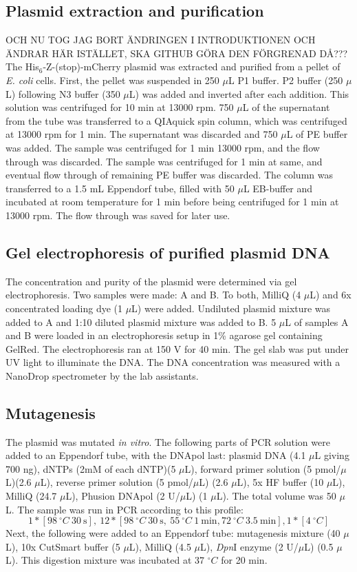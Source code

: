 \documentclass[11pt,a4paper]{article}
\begin{document}
\subsection{Plasmid extraction and purification}
OCH NU TOG JAG BORT ÄNDRINGEN I INTRODUKTIONEN OCH ÄNDRAR HÄR ISTÄLLET, SKA GITHUB GÖRA DEN FÖRGRENAD DÅ??? The His$_6$-Z-(stop)-mCherry plasmid was extracted and purified from a pellet of \textit{E. coli} cells. First, the pellet was suspended in 250 $\mu$L P1 buffer. P2 buffer (250 $\mu$L) following N3 buffer (350 $\mu$L) was added and inverted after each addition. This solution was centrifuged for 10 min at 13000 rpm. 750 $\mu$L of the supernatant from the tube was transferred to a QIAquick spin column, which was centrifuged at 13000 rpm for 1 min. The supernatant was discarded and 750 $\mu$L of PE buffer was added. The sample was centrifuged for 1 min 13000 rpm, and the flow through was discarded. The sample was centrifuged for 1 min at same, and eventual flow through of remaining PE buffer was discarded. The column was transferred to a 1.5 mL Eppendorf tube, filled with 50 $\mu$L EB-buffer and incubated at room temperature for 1 min before being centrifuged for 1 min at 13000 rpm. The flow through was saved for later use.

\subsection{Gel electrophoresis of purified plasmid DNA}

The concentration and purity of the plasmid were determined via gel electrophoresis. Two samples were made: A and B. To both, MilliQ (4 $\mu$L) and 6x concentrated loading dye (1 $\mu$L) were added. Undiluted plasmid mixture was added to A and 1:10 diluted plasmid mixture was added to B. 5 $\mu$L of samples A and B were loaded in an electrophoresis setup in 1\% agarose gel containing GelRed. The electrophoresis ran at 150 V for 40 min. The gel slab was put under UV light to illuminate the DNA. The DNA concentration was measured with a NanoDrop spectrometer by the lab assistants.

\subsection{Mutagenesis}
The plasmid was mutated \textit{in vitro}. The following parts of PCR solution were added to an Eppendorf tube, with the DNApol last: plasmid DNA (4.1 $\mu$L giving 700 ng), dNTPs (2mM of each dNTP)(5 $\mu$L), forward primer solution (5 pmol/$\mu$L)(2.6 $\mu$L), reverse primer solution (5 pmol/$\mu$L) (2.6 $\mu$L), 5x HF buffer (10 $\mu$L), MilliQ (24.7 $\mu$L), Phusion DNApol (2 U/$\mu$L) (1 $\mu$L). The total volume was 50 $\mu$L. The sample was run in PCR according to this profile: $$1*[98 \: ^{\circ}C \: 30 \: \textrm{s}], \: 12*[98 \: ^{\circ}C \: 30 \: \textrm{s}, \: 55 \: ^{\circ}C \: 1 \: \textrm{min}, 72 \: ^{\circ}C \: 3.5 \: \textrm{min}], 1*[4 \: ^{\circ}C]$$
Next, the following were added to an Eppendorf tube: mutagenesis mixture (40 $\mu$L), 10x CutSmart buffer (5 $\mu$L), MilliQ (4.5 $\mu$L), \textit{Dpn}I enzyme (2 U/$\mu$L) (0.5 $\mu$L). This digestion mixture was incubated at 37 $^\circ C$ for 20 min. 
\end{document}
